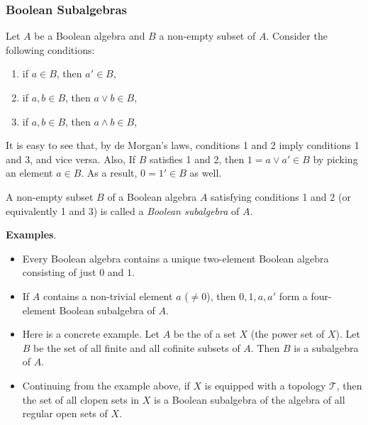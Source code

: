\documentclass[12pt]{article}
\begin{document}
\subsubsection*{Boolean Subalgebras}

Let $A$ be a Boolean algebra and $B$ a non-empty subset of $A$.  Consider the following conditions:
\begin{enumerate}
\item if $a\in B$, then $a'\in B$,
\item if $a,b\in B$, then $a\vee b\in B$,
\item if $a,b\in B$, then $a\wedge b\in B$,
\end{enumerate}

It is easy to see that, by de Morgan's laws, conditions 1 and 2 imply conditions 1 and 3, and vice versa.  Also, If $B$ satisfies 1 and 2, then $1=a\vee a'\in B$ by picking an element $a\in B$.  As a result, $0=1'\in B$ as well.

A non-empty subset $B$ of a Boolean algebra $A$ satisfying conditions 1 and 2 (or equivalently 1 and 3) is called a \emph{Boolean subalgebra} of $A$.

\textbf{Examples}.  
\begin{itemize}
\item Every Boolean algebra contains a unique two-element Boolean algebra consisting of just $0$ and $1$.  
\item If $A$ contains a non-trivial element $a$ ($\ne 0$), then $0,1,a,a'$ form a four-element Boolean subalgebra of $A$.
\item Here is a concrete example.  Let $A$ be the  of a set $X$ (the power set of $X$).  Let $B$ be the set of all finite and all cofinite subsets of $A$.  Then $B$ is a subalgebra of $A$.
\item Continuing from the example above, if $X$ is equipped with a topology $\mathcal{T}$, then the set of all clopen sets in $X$ is a Boolean subalgebra of the algebra of all regular open sets of $X$.
\end{itemize}
\end{document}
